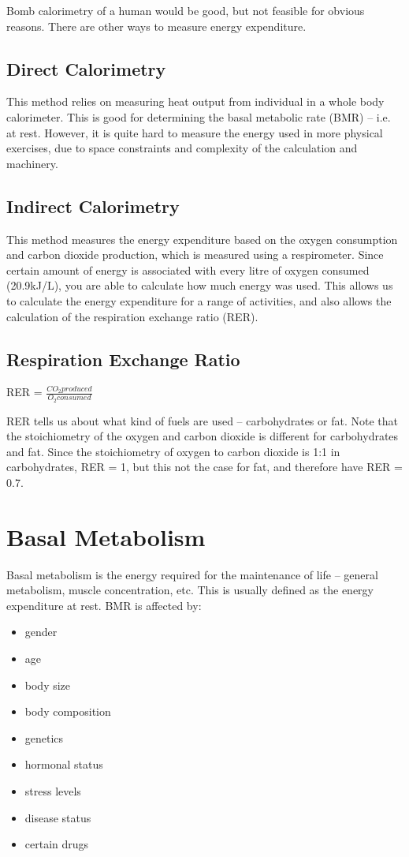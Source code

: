 Bomb calorimetry of a human would be good, but not feasible for obvious reasons.
There are other ways to measure energy expenditure.

\subsection{Direct Calorimetry}

This method relies on measuring heat output from individual in a whole body calorimeter.
This is good for determining the basal metabolic rate (BMR) -- i.e. at rest.
However, it is quite hard to measure the energy used in more physical exercises, due to space constraints and complexity of the calculation and machinery.

\subsection{Indirect Calorimetry}

This method measures the energy expenditure based on the oxygen consumption and carbon dioxide production, which is measured using a respirometer.
Since certain amount of energy is associated with every litre of oxygen consumed (20.9kJ/L), you are able to calculate how much energy was used.
This allows us to calculate the energy expenditure for a range of activities, and also allows the calculation of the respiration exchange ratio (RER).

\subsection{Respiration Exchange Ratio}

\begin{center}
\large{RER = $\frac{CO_2 produced}{O_2 consumed}$}
\end{center}

RER tells us about what kind of fuels are used -- carbohydrates or fat.
Note that the stoichiometry of the oxygen and carbon dioxide is different for carbohydrates and fat.
Since the stoichiometry of oxygen to carbon dioxide is 1:1 in carbohydrates, RER = 1, but this not the case for fat, and therefore have RER = 0.7.

\section{Basal Metabolism}

Basal metabolism is the energy required for the maintenance of life -- general metabolism, muscle concentration, etc.
This is usually defined as the energy expenditure at rest.
BMR is affected by:
\begin{itemize}
\item gender
\item age 
\item body size
\item body composition
\item genetics
\item hormonal status
\item stress levels
\item disease status
\item certain drugs
\end{itemize}

